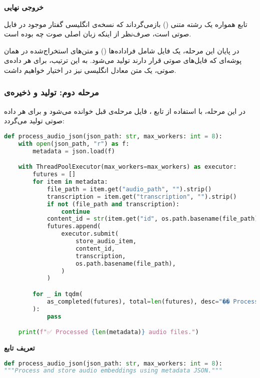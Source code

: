 \documentclass{article}
\begin{document}
\textbf{خروجی نهایی}

تابع همواره یک رشته متنی () بازمی‌گرداند که نسخه‌ی انگلیسی گفتار موجود در فایل صوتی است،  
صرف‌نظر از اینکه زبان اصلی صوت چه بوده است.  

در پایان این مرحله، یک فایل  شامل فراداده‌ها () و متن‌های استخراج‌شده در همان پوشه‌ای که فایل‌های صوتی قرار دارند تولید می‌شود.  
به این ترتیب، برای هر داده‌ی صوتی، یک متن معادل انگلیسی نیز در اختیار خواهیم داشت.


\subsubsection{مرحله دوم: تولید و ذخیره‌ی }

در این مرحله، با استفاده از تابع ، فایل  مرحله‌ی قبل خوانده می‌شود و برای هر داده صوتی  تولید می‌گردد:

\begin{latin}
\begin{lstlisting}[language=Python]
def process_audio_json(json_path: str, max_workers: int = 8):
    with open(json_path, "r") as f:
        metadata = json.load(f)

    with ThreadPoolExecutor(max_workers=max_workers) as executor:
        futures = []
        for item in metadata:
            file_path = item.get("audio_path", "").strip()
            transcription = item.get("transcription", "").strip()
            if not (file_path and transcription):
                continue
            content_id = str(item.get("id", os.path.basename(file_path)))
            futures.append(
                executor.submit(
                    store_audio_item,
                    content_id,
                    transcription,
                    os.path.basename(file_path),
                )
            )

        for _ in tqdm(
            as_completed(futures), total=len(futures), desc="�� Processing audios"
        ):
            pass

    print(f"✅ Processed {len(metadata)} audio files.")
\end{lstlisting}
\end{latin}


\textbf{تعریف تابع}
\begin{latin}
\begin{lstlisting}[language=Python]
def process_audio_json(json_path: str, max_workers: int = 8):
"""Process and store audio embeddings using metadata JSON."""
\end{lstlisting}
\end{latin}
\end{document}
